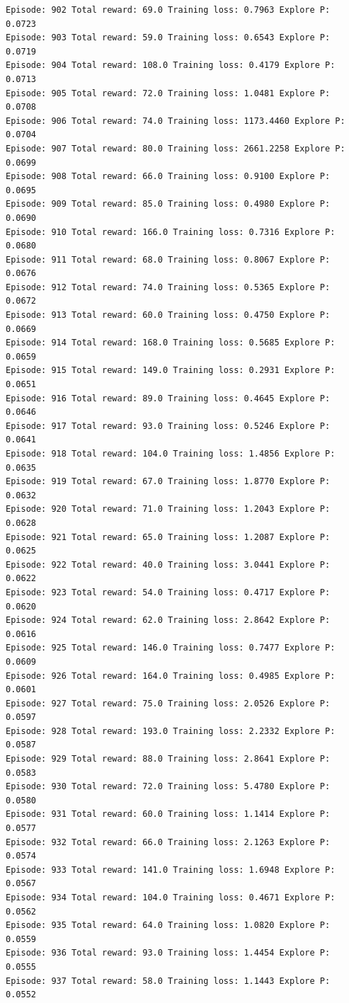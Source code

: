 \documentclass[11pt]{article}
\begin{document}
\begin{Verbatim}[commandchars=\\\{\}]
Episode: 902 Total reward: 69.0 Training loss: 0.7963 Explore P: 0.0723
Episode: 903 Total reward: 59.0 Training loss: 0.6543 Explore P: 0.0719
Episode: 904 Total reward: 108.0 Training loss: 0.4179 Explore P: 0.0713
Episode: 905 Total reward: 72.0 Training loss: 1.0481 Explore P: 0.0708
Episode: 906 Total reward: 74.0 Training loss: 1173.4460 Explore P: 0.0704
Episode: 907 Total reward: 80.0 Training loss: 2661.2258 Explore P: 0.0699
Episode: 908 Total reward: 66.0 Training loss: 0.9100 Explore P: 0.0695
Episode: 909 Total reward: 85.0 Training loss: 0.4980 Explore P: 0.0690
Episode: 910 Total reward: 166.0 Training loss: 0.7316 Explore P: 0.0680
Episode: 911 Total reward: 68.0 Training loss: 0.8067 Explore P: 0.0676
Episode: 912 Total reward: 74.0 Training loss: 0.5365 Explore P: 0.0672
Episode: 913 Total reward: 60.0 Training loss: 0.4750 Explore P: 0.0669
Episode: 914 Total reward: 168.0 Training loss: 0.5685 Explore P: 0.0659
Episode: 915 Total reward: 149.0 Training loss: 0.2931 Explore P: 0.0651
Episode: 916 Total reward: 89.0 Training loss: 0.4645 Explore P: 0.0646
Episode: 917 Total reward: 93.0 Training loss: 0.5246 Explore P: 0.0641
Episode: 918 Total reward: 104.0 Training loss: 1.4856 Explore P: 0.0635
Episode: 919 Total reward: 67.0 Training loss: 1.8770 Explore P: 0.0632
Episode: 920 Total reward: 71.0 Training loss: 1.2043 Explore P: 0.0628
Episode: 921 Total reward: 65.0 Training loss: 1.2087 Explore P: 0.0625
Episode: 922 Total reward: 40.0 Training loss: 3.0441 Explore P: 0.0622
Episode: 923 Total reward: 54.0 Training loss: 0.4717 Explore P: 0.0620
Episode: 924 Total reward: 62.0 Training loss: 2.8642 Explore P: 0.0616
Episode: 925 Total reward: 146.0 Training loss: 0.7477 Explore P: 0.0609
Episode: 926 Total reward: 164.0 Training loss: 0.4985 Explore P: 0.0601
Episode: 927 Total reward: 75.0 Training loss: 2.0526 Explore P: 0.0597
Episode: 928 Total reward: 193.0 Training loss: 2.2332 Explore P: 0.0587
Episode: 929 Total reward: 88.0 Training loss: 2.8641 Explore P: 0.0583
Episode: 930 Total reward: 72.0 Training loss: 5.4780 Explore P: 0.0580
Episode: 931 Total reward: 60.0 Training loss: 1.1414 Explore P: 0.0577
Episode: 932 Total reward: 66.0 Training loss: 2.1263 Explore P: 0.0574
Episode: 933 Total reward: 141.0 Training loss: 1.6948 Explore P: 0.0567
Episode: 934 Total reward: 104.0 Training loss: 0.4671 Explore P: 0.0562
Episode: 935 Total reward: 64.0 Training loss: 1.0820 Explore P: 0.0559
Episode: 936 Total reward: 93.0 Training loss: 1.4454 Explore P: 0.0555
Episode: 937 Total reward: 58.0 Training loss: 1.1443 Explore P: 0.0552

\end{Verbatim}
\end{document}
